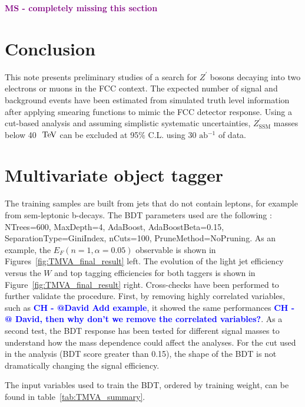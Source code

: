 \documentclass[a4paper,11pt]{article}
\newcommand{\CH}[1] {\textbf{\textcolor{blue}{CH - #1}}}
\newcommand{\MS}[1] {\textbf{\textcolor{purple}{MS - #1}}}
\newcommand{\Zp}{\ensuremath{Z^{\prime}}}
\newcommand{\ZpSSM}{\ensuremath{Z^{\prime}_{\mathrm{SSM}}}}
\newcommand*{\Zptt}{\ensuremath{Z^{\prime} \rightarrow \ttbar}}
\newcommand*{\rsg}{\ensuremath{G_{RS} \rightarrow W^+W^-}}
\newcommand*{\ttbar}{\ensuremath{t\bar{t}}}
\def\afb{\mbox{ab$^{-1}$}}%
\def\TeV{\ifmmode {\mathrm{\ Te\kern -0.1em V}}\else
                   \textrm{Te\kern -0.1em V}\fi}%
\begin{document}
\MS{completely missing this section}

\section{Conclusion}
\label{sec:conc}

This note presents preliminary studies of a search for $\Zp$
bosons decaying into two electrons or muons in the FCC context. The expected number
of signal and background events have been estimated from simulated truth level information
after applying smearing functions to mimic the FCC detector response.
Using a cut-based analysis and assuming simplistic systematic uncertainties, $\ZpSSM$
masses below 40 $\TeV$ can be excluded at 95$\%$ C.L.
using 30 $\afb{}$ of data.

\appendix
\section{Multivariate object tagger}
\label{sec:app:mva}
The training samples are built from jets that do not contain leptons, for example from sem-leptonic b-decays.
The BDT parameters used are the following : NTrees=600, MaxDepth=4, AdaBoost, AdaBoostBeta=0.15, SeparationType=GiniIndex, nCuts=100, PruneMethod=NoPruning.
As an example, the $E_{F}(n=1,\alpha=0.05)$ observable is shown in Figures~\ref{fig:TMVA_final_result} left.
The evolution of the light jet efficiency versus the $W$ and top tagging efficiencies for both taggers is shown in Figure~\ref{fig:TMVA_final_result} right.
Cross-checks have been performed to further validate the procedure. First, by removing highly correlated variables, such as \CH{@David Add example}, it showed the same performances \CH{@ David, then why don't we remove the correlated variables?}.
As a second test, the BDT response has been tested for different signal masses to understand how the mass dependence could affect the analyses. For the cut used in the analysis (BDT score greater than 0.15), the shape of the BDT is not dramatically changing the signal efficiency.%

The input variables used to train the BDT, ordered by training weight, can be found in table~\ref{tab:TMVA_summary}.
\end{document}
